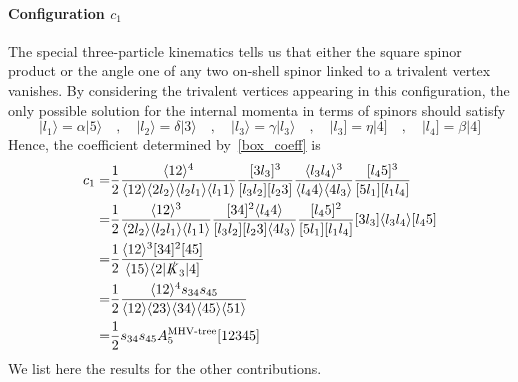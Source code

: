 \paragraph{Configuration $c_1$}
The special three-particle kinematics tells us that either the square spinor product or the angle one of any two on-shell spinor linked to a trivalent vertex vanishes.
By considering the trivalent vertices appearing in this configuration, the only possible solution for the internal momenta in terms of spinors should satisfy
\begin{equation}
|l_1\rangle = \alpha |5\rangle \quad,\quad
|l_2\rangle = \delta |3\rangle \quad,\quad
|l_3\rangle = \gamma |l_3\rangle\quad,\quad
|l_3] = \eta|4]\quad,\quad
|l_4] = \beta |4]
\end{equation}
Hence, the coefficient determined by~\cref{box_coeff} is
\begin{equation}\label{coef_c_1}
\begin{split}
c_1 = &
\frac{1}{2}\frac{\langle 12 \rangle^4}{\langle 1 2 \rangle \langle 2 l_2\rangle \langle l_2 l_1 \rangle\langle l_1 1 \rangle}
\frac{[3l_3]^3}{[l_3 l_2][l_2 3]}
\frac{\langle l_3 l_4 \rangle^{3}}{\langle l_4 4 \rangle \langle 4 l_3\rangle}
\frac{[l_4 5 ]^3}{[5l_1][l_1 l_4]}
\\
= & 
\frac{1}{2}\frac{\langle 12 \rangle^3}{\langle 2 l_2 \rangle\langle l_2 l_1 \rangle\langle l_1 1\rangle}
\frac{[34]^2\langle l_4 4\rangle}{[l_3 l_2][l_2 3]\langle 4 l_3\rangle}
\frac{[l_4 5]^2}{[5l_1 ][l_1 l_4]}
[3 l_3]\langle l_3 l_4 \rangle [l_4 5]
\\
= &
\frac{1}{2}
\frac{\langle 12 \rangle^3[34]^2[45]}{\langle 15 \rangle\langle2|\slashed{K}_{3}|4]}
\\
= &
\frac{1}{2}\frac{\langle 12 \rangle^4 s_{34}s_{45}}{\langle 12 \rangle\langle 23 \rangle \langle 34\rangle \langle 45\rangle \langle 51\rangle}
\\
= &
\frac{1}{2}s_{34}s_{45}A_5^{\textrm{MHV-tree}}[12345]
\end{split}
\end{equation}
We list here the results for the other contributions. 
